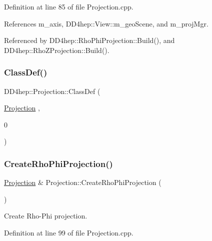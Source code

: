 Definition at line 85 of file Projection.\+cpp.



References m\+\_\+axis, D\+D4hep\+::\+View\+::m\+\_\+geo\+Scene, and m\+\_\+proj\+Mgr.



Referenced by D\+D4hep\+::\+Rho\+Phi\+Projection\+::\+Build(), and D\+D4hep\+::\+Rho\+Z\+Projection\+::\+Build().

\hypertarget{class_d_d4hep_1_1_projection_a32d78dc00500fcb000ce25052c96fd62}{}\label{class_d_d4hep_1_1_projection_a32d78dc00500fcb000ce25052c96fd62} 
\subsubsection{\texorpdfstring{Class\+Def()}{ClassDef()}}
{\footnotesize\ttfamily D\+D4hep\+::\+Projection\+::\+Class\+Def (\begin{DoxyParamCaption}\item[{\hyperlink{class_d_d4hep_1_1_projection}{Projection}}]{,  }\item[{0}]{ }\end{DoxyParamCaption})}

\hypertarget{class_d_d4hep_1_1_projection_aa2e3b7e69527aca46f8531e4fc523f1f}{}\label{class_d_d4hep_1_1_projection_aa2e3b7e69527aca46f8531e4fc523f1f} 
\subsubsection{\texorpdfstring{Create\+Rho\+Phi\+Projection()}{CreateRhoPhiProjection()}}
{\footnotesize\ttfamily \hyperlink{class_d_d4hep_1_1_projection}{Projection} \& Projection\+::\+Create\+Rho\+Phi\+Projection (\begin{DoxyParamCaption}{ }\end{DoxyParamCaption})\hspace{0.3cm}{\ttfamily [virtual]}}



Create Rho-\/\+Phi projection. 



Definition at line 99 of file Projection.\+cpp.



